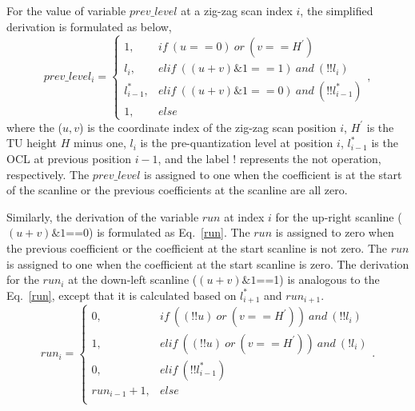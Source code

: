 \documentclass[lettersize,journal]{IEEEtran}
\begin{document}
For the value of variable $prev\_level$ at a zig-zag scan index $i$, the simplified derivation is formulated as below, 
\begin{equation}
	prev\_level_{i} =\begin{cases}
		\label{prevlevel}
		1,           & if \ (u==0)\ or\ (v==H^{'}) \\
		l_{i},       & elif \ ((u+v)\&1==1)\ and\ (!!l_{i}) \\
		l_{i-1}^{*}, & elif \ ((u+v)\&1==0)\ and\ (!!l_{i-1}^{*}) \\
            1,        & else 
	\end{cases},
\end{equation}
where the ($u, v$) is the coordinate index of the zig-zag scan position $i$, $H^{'}$ is the TU height $H$ minus one, $l_{i}$ is the pre-quantization level at position $i$, $l_{i-1}^{*}$ is the OCL at previous position $i-1$, and the label ! represents the not operation, respectively. 
The $prev\_level$ is assigned to one when the coefficient is at the start of the scanline or the previous coefficients at the scanline are all zero.


Similarly, the derivation of the variable $run$ at index $i$ for the up-right scanline ($(u+v)\&1$==0) is formulated as Eq.~\eqref{run}. The $run$ is assigned to zero when the previous coefficient or the coefficient at the start scanline is not zero. The $run$ is assigned to one when the coefficient at the start scanline is zero. 
The derivation for the $run_{i}$ at the down-left scanline ($(u+v)\&1$==1) is analogous to the Eq.~\eqref{run}, except that it is calculated based on $l_{i+1}^{*}$ and $run_{i+1}$. 
\begin{equation}
	run_{i}=\begin{cases}
	\label{run}
	0,            & if \ ((!!u)\ or \ (v==H^{'}))\ and \ (!!l_{i}) \\
	1,            & elif \ ((!!u)\ or \ (v==H^{'}))\ and \ (!l_{i})\\
	0,            & elif \  (!!l_{i-1}^{*})\\
	run_{i-1}+1,  & else  \\
\end{cases} .
\end{equation}
\end{document}
